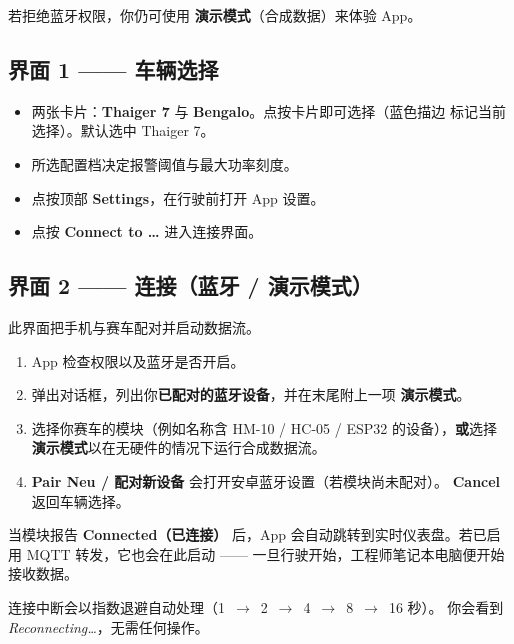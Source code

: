 \documentclass[11pt,a4paper,oneside]{report}
\newcommand{\arrow}{\,$\rightarrow$\,}
\begin{document}
\medskip
若拒绝蓝牙权限，你仍可使用 \textbf{演示模式}（合成数据）来体验 App。

\subsection{界面 1 —— 车辆选择}
\begin{itemize}
  \item 两张卡片：\textbf{Thaiger 7} 与 \textbf{Bengalo}。点按卡片即可选择（蓝色描边
    标记当前选择）。默认选中 Thaiger 7。
  \item 所选配置档决定报警阈值与最大功率刻度。
  \item 点按顶部 \textbf{Settings}，在行驶前打开 App 设置。
  \item 点按 \textbf{Connect to \ldots} 进入连接界面。
\end{itemize}

\subsection{界面 2 —— 连接（蓝牙 / 演示模式）}
此界面把手机与赛车配对并启动数据流。
\begin{enumerate}
  \item App 检查权限以及蓝牙是否开启。
  \item 弹出对话框，列出你\textbf{已配对的蓝牙设备}，并在末尾附上一项 \textbf{演示模式}。
  \item 选择你赛车的模块（例如名称含 HM-10 / HC-05 / ESP32 的设备），\textbf{或}选择
    \textbf{演示模式}以在无硬件的情况下运行合成数据流。
  \item \textbf{Pair Neu / 配对新设备} 会打开安卓蓝牙设置（若模块尚未配对）。
    \textbf{Cancel} 返回车辆选择。
\end{enumerate}
当模块报告 \textbf{Connected（已连接）} 后，App 会自动跳转到实时仪表盘。若已启用 MQTT
转发，它也会在此启动 —— 一旦行驶开始，工程师笔记本电脑便开始接收数据。
\begin{tgnote}
连接中断会以指数退避自动处理（1 \arrow{} 2 \arrow{} 4 \arrow{} 8 \arrow{} 16 秒）。
你会看到 \emph{Reconnecting\ldots}，无需任何操作。
\end{tgnote}
\end{document}
